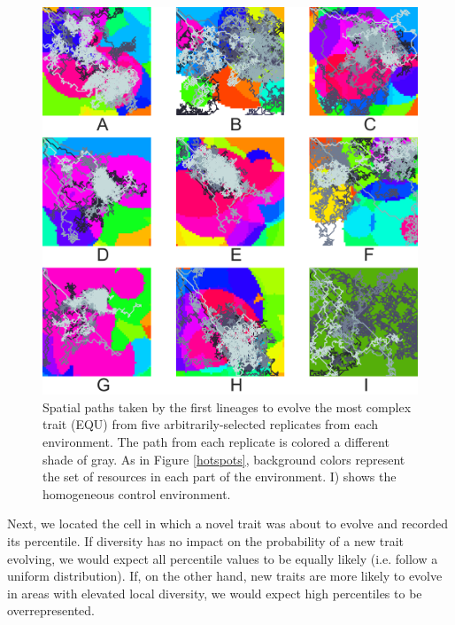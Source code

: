\begin{figure}[t]
\begin{center}
\includegraphics[width=5in]{figs/control_9_paths.png}
\caption{Spatial paths taken by the first lineages to evolve the most complex trait (EQU) from five arbitrarily-selected replicates from each environment. The path from each replicate is colored a different shade of gray. As in Figure \ref{hotspots}, background colors represent the set of resources in each part of the environment. I) shows the homogeneous control environment.}
\label{paths}
\end{center}
\end{figure}

Next, we located the cell in which a novel trait was about to evolve and recorded its percentile. If diversity has no impact on the probability of a new trait evolving, we would expect all percentile values to be equally likely (i.e. follow a uniform distribution). If, on the other hand, new traits are more likely to evolve in areas with elevated local diversity, we would expect high percentiles to be overrepresented.

